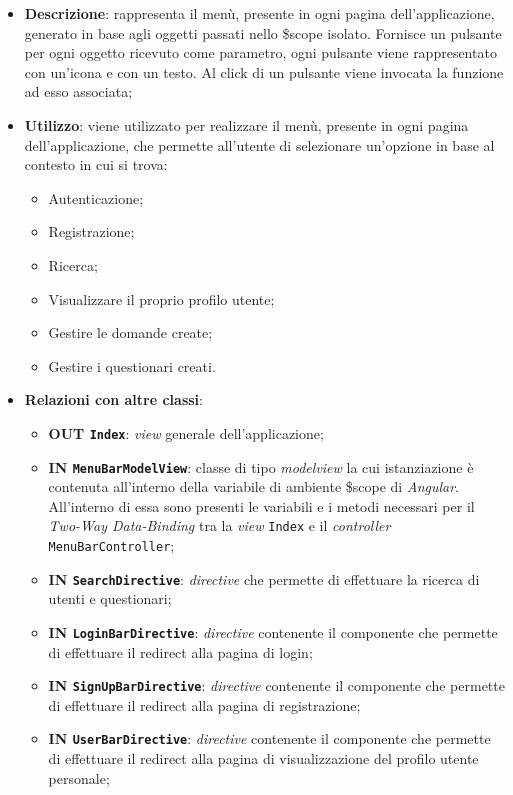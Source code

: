\begin{itemize}
	\item \textbf{Descrizione}: rappresenta il menù, presente in ogni pagina dell'applicazione, generato in base agli oggetti passati nello \$scope isolato. Fornisce un pulsante per ogni oggetto ricevuto come parametro, ogni pulsante viene rappresentato con un'icona e con un testo. Al click di un pulsante viene invocata la funzione ad esso associata;
	\item \textbf{Utilizzo}: viene utilizzato per realizzare il menù, presente in ogni pagina dell'applicazione, che permette all'utente di selezionare un'opzione in base al contesto in cui si trova:
		\begin{itemize}
			\item Autenticazione;
			\item Registrazione;
			\item Ricerca;
			\item Visualizzare il proprio profilo utente;
			\item Gestire le domande create;
			\item Gestire i questionari creati.
		\end{itemize}
	\item \textbf{Relazioni con altre classi}: 
	\begin{itemize}
		\item \textbf{OUT \texttt{Index}}: \textit{view} generale dell'applicazione;
		\item \textbf{IN \texttt{MenuBarModelView}}: classe di tipo \textit{modelview} la cui istanziazione è contenuta all'interno della variabile di ambiente \$scope di \textit{Angular}. All'interno di essa sono presenti le variabili e i metodi necessari per il \textit{Two-Way Data-Binding} tra la \textit{view} \texttt{Index} e il \textit{controller} \texttt{MenuBarController};
		\item \textbf{IN \texttt{SearchDirective}}: \textit{directive} che permette di effettuare la ricerca di utenti e questionari;
		\item \textbf{IN \texttt{LoginBarDirective}}: \textit{directive} contenente il componente che permette di effettuare il redirect alla pagina di login;
		\item \textbf{IN \texttt{SignUpBarDirective}}: \textit{directive} contenente il componente che permette di effettuare il redirect alla pagina di registrazione;
		\item \textbf{IN \texttt{UserBarDirective}}: \textit{directive} contenente il componente che permette di effettuare il redirect alla pagina di visualizzazione del profilo utente personale;

\end{itemize}
\end{itemize}
